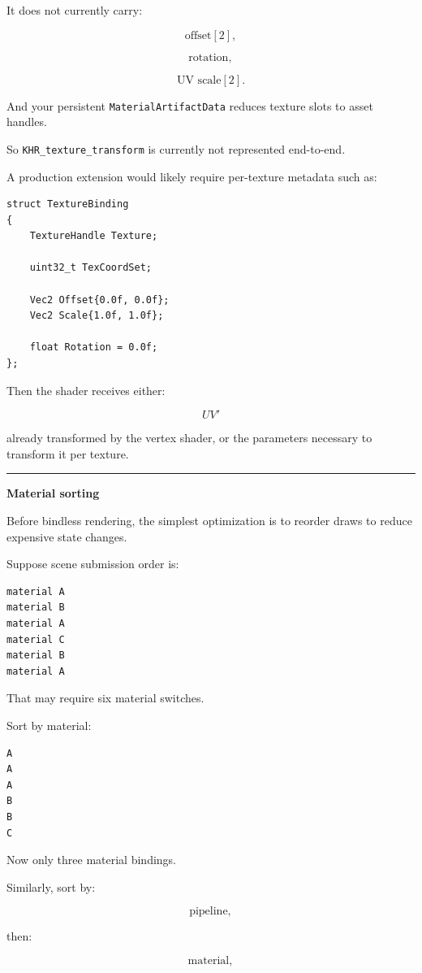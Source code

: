It does not currently carry:

\[
\text{offset}[2],
\]

\[
\text{rotation},
\]

\[
\text{UV scale}[2].
\]

And your persistent \texttt{MaterialArtifactData} reduces texture slots to asset handles.

So \texttt{KHR\_texture\_transform} is currently not represented end-to-end.

A production extension would likely require per-texture metadata such as:

\begin{verbatim}
struct TextureBinding
{
    TextureHandle Texture;

    uint32_t TexCoordSet;

    Vec2 Offset{0.0f, 0.0f};
    Vec2 Scale{1.0f, 1.0f};

    float Rotation = 0.0f;
};
\end{verbatim}

Then the shader receives either:

\[
UV'
\]

already transformed by the vertex shader, or the parameters necessary to transform it per texture.

\begin{center}\rule{0.5\linewidth}{0.5pt}\end{center}

\textbf{Material sorting}

Before bindless rendering, the simplest optimization is to reorder draws to reduce expensive state changes.

Suppose scene submission order is:

\begin{verbatim}
material A
material B
material A
material C
material B
material A
\end{verbatim}

That may require six material switches.

Sort by material:

\begin{verbatim}
A
A
A
B
B
C
\end{verbatim}

Now only three material bindings.

Similarly, sort by:

\[
\text{pipeline},
\]

then:

\[
\text{material},
\]

